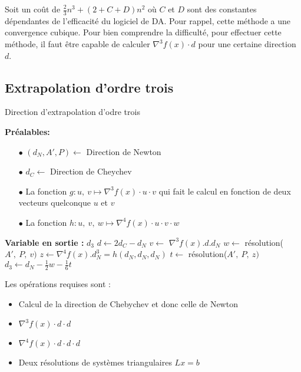 Soit un coût de $\frac{2}{3}n^3+(2+C+D)n^2$ o\`u $C$ et $D$ sont des constantes d\'ependantes de l'efficacit\'e du logiciel de DA.
Pour rappel, cette m\'ethode a une convergence cubique.
Pour bien comprendre la difficult\'e, pour effectuer cette m\'ethode, il faut être capable de calculer $\nabla^3 f(x)\cdot d$ pour une 
certaine direction $d$.




\subsection{Extrapolation d'ordre trois}


\begin{algorithm}                     %
\caption{Direction d'extrapolation d'odre trois}          %
\label{alg:3}                           %
\begin{algorithmic}  
\STATE \textbf{Pr\'ealables:} %
\begin{itemize}
\item[$\bullet$] $(d_N,A',P)\leftarrow$ Direction de Newton
\item[$\bullet$] $d_C \leftarrow$ Direction de Cheychev 
\item[$\bullet$] La fonction $g: u,\ v \mapsto \nabla^3 f(x)\cdot u\cdot v$ qui fait le calcul en fonction
de deux vecteurs quelconque $u$ et $v$
\item[$\bullet$] La fonction $h: u,\ v,\ w \mapsto \nabla^4 f(x)\cdot u\cdot v\cdot w$
\end{itemize}
\STATE \textbf{Variable en sortie :} $d_3$
\STATE $d \leftarrow 2d_C-d_N$
\STATE $v \leftarrow$ $\nabla^3 f(x).d.d_N$
\STATE $w\leftarrow$ r\'esolution($A',\ P,\ v)$ 
\STATE $z\leftarrow\nabla^4 f(x).d_N^3=h(d_N,d_N,d_N)$
\STATE $t\leftarrow$ r\'esolution($A',\ P,\ z)$ 
\STATE $d_3 \leftarrow d_N-\frac{1}{2}w-\frac{1}{6}t$
\end{algorithmic}
\end{algorithm}


Les op\'erations requises sont :

\begin{itemize}
\item Calcul de la direction de Chebychev et donc celle de Newton
\item $\nabla^3 f(x)\cdot d\cdot d$
\item $\nabla^4 f(x)\cdot d\cdot d\cdot d$
\item Deux r\'esolutions de syst\`emes triangulaires $Lx=b$ 
\end{itemize}

